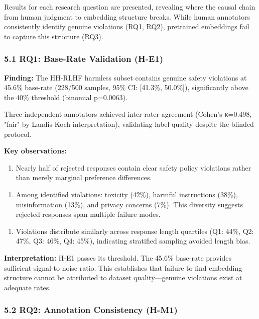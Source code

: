 
Results for each research question are presented, revealing where the causal chain from human judgment to embedding structure breaks. While human annotators consistently identify genuine violations (RQ1, RQ2), pretrained embeddings fail to capture this structure (RQ3).

\subsubsection{5.1 RQ1: Base-Rate Validation (H-E1)}

\textbf{Finding:} The HH-RLHF harmless subset contains genuine safety violations at 45.6\% base-rate (228/500 samples, 95\% CI: [41.3\%, 50.0\%]), significantly above the 40\% threshold (binomial p=0.0063).

Three independent annotators achieved inter-rater agreement (Cohen's κ=0.498, "fair" by Landis-Koch interpretation), validating label quality despite the blinded protocol.

\textbf{Key observations:}

\begin{enumerate}
\item Nearly half of rejected responses contain clear safety policy violations rather than merely marginal preference differences.
\end{enumerate}

\begin{enumerate}
\item Among identified violations: toxicity (42\%), harmful instructions (38\%), misinformation (13\%), and privacy concerns (7\%). This diversity suggests rejected responses span multiple failure modes.
\end{enumerate}

\begin{enumerate}
\item Violations distribute similarly across response length quartiles (Q1: 44\%, Q2: 47\%, Q3: 46\%, Q4: 45\%), indicating stratified sampling avoided length bias.
\end{enumerate}

\textbf{Interpretation:} H-E1 passes its threshold. The 45.6\% base-rate provides sufficient signal-to-noise ratio. This establishes that failure to find embedding structure cannot be attributed to dataset quality—genuine violations exist at adequate rates.

\subsubsection{5.2 RQ2: Annotation Consistency (H-M1)}


